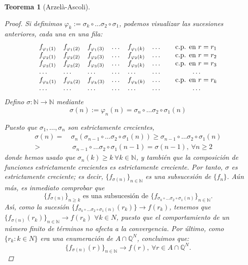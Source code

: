 \documentclass[11pt, a4paper]{article}
\theoremstyle{theorem-style}
\newtheorem{nth}{Teorema}[section]
\theoremstyle{definition-style}
\theoremstyle{remark-style}
\theoremstyle{example-style}
\begin{document}
\begin{nth}[Arzelà-Ascoli]
\begin{proof}
Si definimos $\varphi_k:= \sigma_k \circ \dots \sigma_2 \circ\sigma_1$, podemos visualizar las sucesiones anteriores, cada una en una fila:
\[
 \begin{array}{lllllll}
{f_{\varphi_1 (1)}}& f_{\varphi_1 (2)} & f_{\varphi_1 (3)} & \dots &f_{\varphi_1 (k)} & \dots & \hspace{0.25cm} \mbox{ c.p. en } r=r_1
 \\
 f_{\varphi_2 (1)} & {f_{\varphi_2 (2)}} & f_{\varphi_2 (3)} & \dots &f_{\varphi_2 (k)} & \dots & \hspace{0.25cm} \mbox{ c.p. en } r=r_2
 \\
 f_{\varphi_3 (1)} & f_{\varphi_3 (2)} & {f_{\varphi_3 (3)}} & \dots &f_{\varphi_3 (k)} & \dots & \hspace{0.25cm} \mbox{ c.p. en } r=r_3
 \\
 \dots & \dots & \dots& \dots &\dots & \dots & \hspace{1.25cm} \dots
 \\
f_{\varphi_k (1)} & f_{\varphi_k (2)} & f_{\varphi_k (3)} & \dots &{f_{\varphi_k (k)}} & \dots & \hspace{0.25cm} \mbox{ c.p. en } r=r_k
 \\
 \dots & \dots & \dots& \dots &\dots & \dots & \hspace{1.25cm} \dots
 \end{array}
 \]
Defino $\sigma:\mathbb N\longrightarrow \mathbb N$ mediante
\[
\sigma (n):= \varphi_n(n)= \sigma_n \circ \dots \sigma_2 \circ\sigma_1 (n)
\]

Puesto que $\sigma_1, \dots ,\sigma_n$ son estrictamente crecientes, 
\[
\begin{aligned}
\sigma (n) = \ & \sigma_n ( \sigma_{n-1} \circ \dots \sigma_2 \circ\sigma_1 (n)) 
\geq \sigma_{n-1} \circ \dots \sigma_2 \circ\sigma_1 (n)
\\
>& \ \sigma_{n-1} \circ \dots \sigma_2 \circ\sigma_1 (n-1) = \sigma (n-1) , \ \forall n\geq 2
\end{aligned}
\]
donde hemos usado que $\sigma_n(k) \ge k \ \forall k \in \mathbb{N}$, y también que la composición de funciones estrictamente crecientes es estrictamente creciente. Por tanto, $\sigma$ es estrictamente creciente; es decir,  $\{f_{\sigma (n)} \}_{n\in\mathbb N}$ es una subsucesión de $\{f_n\}$. A\'un m\'as, es inmediato comprobar que
\[
\{f_{\sigma (n)}\}_{n\geq k} \mbox{ es una subsucesi\'on de } 
\{ f_{\sigma_k \circ \dots \sigma_2 \circ\sigma_1 (n)}  \}_{n\in\mathbb N} .
\]
As\'{\i}, como la sucesión $\{ f_{\sigma_k \circ \dots \sigma_2 \circ\sigma_1 (n)} (r_k) \} \to f(r_k)$, tenemos que $\{f_{\sigma (n)} (r_k) \}_{n\in\mathbb N} \longrightarrow f(r_k)$ $\forall k\in N$, puesto que el comportamiento de un número finito de términos no afecta a la convergencia. Por último, como $\{r_k : k \in N \}$ era una enumeración de $A \cap \mathbb Q^N$, concluimos que:
\[
\{f_{\sigma (n)} (r) \}_{n\in\mathbb N} \longrightarrow f(r), \ \forall r\in A\cap \mathbb Q^N.
\]


\end{proof}
\end{nth}
\end{document}
